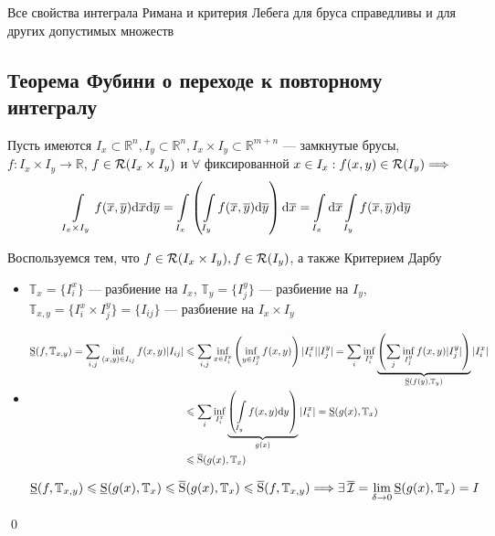 \documentclass[a4paper]{article}
\begin{document}
\comment Все свойства интеграла Римана и критерия Лебега для бруса справедливы и для других допустимых множеств
 
\subsection{Теорема Фубини о переходе к повторному интегралу}
Пусть имеются $I_x\subset\mathbb{R}^n, I_y\subset\mathbb{R}^n, I_x\times I_y\subset \mathbb{R}^{m+n}$ — замкнутые брусы, $f:I_x\times I_y\rightarrow \mathbb{R}$, $f\in\mathcal{R}(I_x\times I_y)$ и $\forall$ фиксированной $x\in I_x:f(x,y)\in\mathcal{R}(I_y)\Longrightarrow$
\begin{equation*}
    \int\limits_{I_x\times I_y} f(\overline{x}, \overline{y})\text{d}\overline{x}\text{d}\overline{y}=\int\limits_{I_x}\left(\int\limits_{I_y}f(\overline{x},\overline{y})\text{d}\overline{y}\right)\text{d}\overline{x}=\int\limits_{I_x}\text{d}\overline{x}\int\limits_{I_y}f(\overline{x}, \overline{y})\text{d}\overline{y}
\end{equation*}

\proof Воспользуемся тем, что $f\in\mathcal{R}(I_x\times I_y),f\in\mathcal{R}(I_y)$, а также Критерием Дарбу
\begin{itemize}
    \item $\mathbb{T}_x=\{I_i^x\}$ — разбиение на $I_x$, $\mathbb{T}_y=\{I_j^y\}$ — разбиение на $I_y$, $\mathbb{T}_{x,y}=\{I_i^x\times I^y_j\}=\{I_{ij}\}$ — разбиение на $I_x\times I_y$
    \item \begin{equation*}
        \begin{aligned}
            \us(f,\mathbb{T}_{x,y})=\sum_{i,j} \inf\limits_{(x,y)\in I_{ij}} f(x,y)|I_{ij}|&\leqslant \sum_{i,j} \inf\limits_{x\in I_i^x} \left(\inf\limits_{y\in I_j^y} f(x,y)\right)|I_i^x||I_j^y|=\sum_i \inf\limits_{I^x_i} \underbrace{\left(\sum_j \inf\limits_{I^y_j} f(x,y)|I_j^y|\right)}_{\us(f(y), \mathbb{T}_y)}|I_i^x|\\
            &\leqslant \sum_i \inf\limits_{I^x_i}\underbrace{\left(\int\limits_{I_y} f(x,y)\d{y}\right)}_{g(x)}|I_i^x|=\us(g(x),\mathbb{T}_x)\\
            &\leqslant \os(g(x),\mathbb{T}_x)
        \end{aligned}
    \end{equation*}

    $\operatorname{\underline{S}}(f,\mathbb{T}_{x,y})\leqslant \operatorname{\underline{S}}(g(x),\mathbb{T}_x)\leqslant\operatorname{\overline{S}}(g(x), \mathbb{T}_x)\leqslant\operatorname{\overline{S}}(f,\mathbb{T}_{x,y})\Longrightarrow\exists \operatorname{\overline{\mathcal{I}}}=\lim\limits_{\delta\rightarrow0} \operatorname{\underline{S}}(g(x),\mathbb{T}_x)=I$
\end{itemize}\qed
\end{document}
